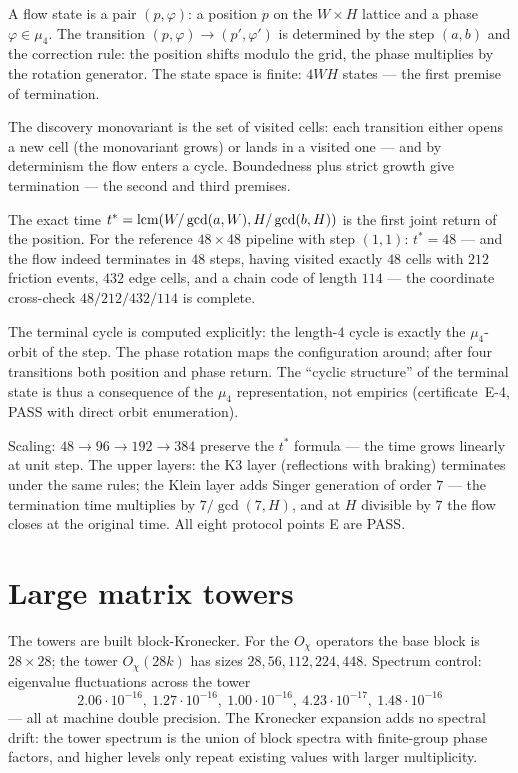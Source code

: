 A flow state is a pair $(p,\varphi)$: a position $p$ on the
$W\times H$ lattice and a phase $\varphi\in\mu_4$. The transition
$(p,\varphi)\to(p',\varphi')$ is determined by the step $(a,b)$ and
the correction rule: the position shifts modulo the grid, the phase
multiplies by the rotation generator. The state space is finite:
$4WH$ states --- the first premise of termination.

The discovery monovariant is the set of visited cells: each
transition either opens a new cell (the monovariant grows) or lands
in a visited one --- and by determinism the flow enters a cycle.
Boundedness plus strict growth give termination --- the second and
third premises.

The exact time $t^*=\operatorname{lcm}(W/\gcd(a,W),H/\gcd(b,H))$ is the first
joint return of the position. For the reference $48\times48$
pipeline with step $(1,1)$: $t^*=48$ --- and the flow indeed
terminates in $48$ steps, having visited exactly $48$ cells with
$212$ friction events, $432$ edge cells, and a chain code of length
$114$ --- the coordinate cross-check $48/212/432/114$ is complete.

The terminal cycle is computed explicitly: the length-$4$ cycle is
exactly the $\mu_4$-orbit of the step. The phase rotation maps the
configuration around; after four transitions both position and phase
return. The ``cyclic structure'' of the terminal state is thus a
consequence of the $\mu_4$ representation, not empirics
(certificate~E-4, PASS with direct orbit enumeration).

Scaling: $48\to96\to192\to384$ preserve the $t^*$ formula --- the
time grows linearly at unit step. The upper layers: the K3 layer
(reflections with braking) terminates under the same rules; the
Klein layer adds Singer generation of order $7$ --- the termination
time multiplies by $7/\gcd(7,H)$, and at $H$ divisible by $7$ the
flow closes at the original time. All eight protocol points E are
PASS.

\section{Large matrix towers}\label{sec:towers}

The towers are built block-Kronecker. For the $O_\chi$ operators the
base block is $28\times28$; the tower $O_\chi(28k)$ has sizes
$28,56,112,224,448$. Spectrum control: eigenvalue fluctuations
across the tower
\[
  2.06\cdot10^{-16},\ 1.27\cdot10^{-16},\ 1.00\cdot10^{-16},\
  4.23\cdot10^{-17},\ 1.48\cdot10^{-16}
\]
--- all at machine double precision. The Kronecker expansion adds no
spectral drift: the tower spectrum is the union of block spectra
with finite-group phase factors, and higher levels only repeat
existing values with larger multiplicity.


